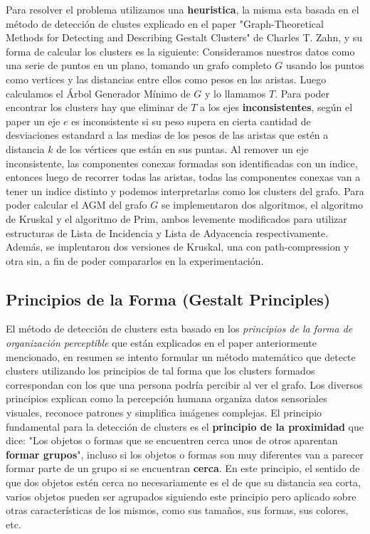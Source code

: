 \documentclass[8pt,a4paper]{article}
\begin{document}
Para resolver el problema utilizamos una \textbf{heuristica}, la misma esta basada en el método de detección de clustes explicado en el paper "Graph-Theoretical Methods for Detecting and Describing Gestalt Clusters" de Charles T. Zahn, y su forma de calcular los clusters es la siguiente: Consideramos nuestros datos como una serie de puntos en un plano, tomando un grafo completo $G$ usando los puntos como vertices y las distancias entre ellos como pesos en las aristas. Luego calculamos el Árbol Generador Mínimo de $G$ y lo llamamos $T$.
Para poder encontrar los clusters hay que eliminar de $T$ a los ejes \textbf{inconsistentes}, según el paper un eje $e$ es inconsistente si su peso supera en cierta cantidad de desviaciones estandard a las medias de los pesos de las aristas que estén a distancia $k$ de los vértices que están en sus puntas. Al remover un eje inconsistente, las componentes conexas formadas son identificadas con un indice, entonces luego de recorrer todas las aristas, todas las componentes conexas van a tener un  indice distinto y podemos interpretarlas como los clusters del grafo.
Para poder calcular el AGM del grafo $G$ se implementaron dos algoritmos, el algoritmo de Kruskal y el algoritmo de Prim, ambos levemente modificados para utilizar estructuras de Lista de Incidencia y Lista de Adyacencia respectivamente. Además, se implentaron dos versiones de Kruskal, una con path-compression y otra sin, a fin de poder compararlos en la experimentación.

\subsection{Principios de la Forma (Gestalt Principles)}

El método de detección de clusters esta basado en los \textit{principios de la forma de organización perceptible} que están explicados en el paper anteriormente mencionado, en resumen se intento formular un método matemático que detecte clusters utilizando los principios de tal forma que los clusters formados correspondan con los que una persona podría percibir al ver el grafo.
Los diversos principios explican como la percepción humana organiza datos sensoriales visuales, reconoce patrones y simplifica imágenes complejas. El principio fundamental para la detección de clusters es el \textbf{principio de la proximidad} que dice: "Los objetos o formas que se encuentren cerca unos de otros aparentan \textbf{formar grupos}", incluso si los objetos o formas son muy diferentes van a parecer formar parte de un grupo si se encuentran \textbf{cerca}. En este principio, el sentido de que dos objetos estén cerca no necesariamente es el de que su distancia sea corta, varios objetos pueden ser agrupados siguiendo este principio pero aplicado sobre otras características de los mismos, como sus tamaños, sus formas, sus colores, etc.
\end{document}
